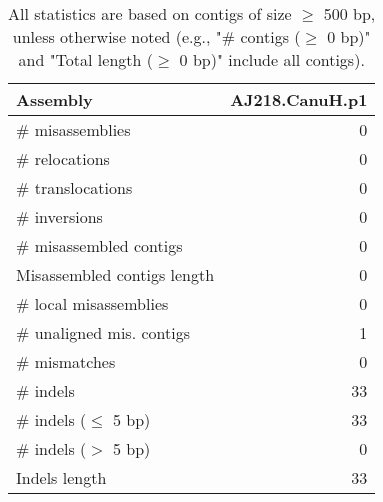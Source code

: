 \documentclass[12pt,a4paper]{article}
\begin{document}
\begin{table}[ht]
\begin{center}
\caption{All statistics are based on contigs of size $\geq$ 500 bp, unless otherwise noted (e.g., "\# contigs ($\geq$ 0 bp)" and "Total length ($\geq$ 0 bp)" include all contigs).}
\begin{tabular}{|l*{1}{|r}|}
\hline
Assembly & AJ218.CanuH.p1 \\ \hline
\# misassemblies & 0 \\ \hline
\hspace{5mm}\# relocations & 0 \\ \hline
\hspace{5mm}\# translocations & 0 \\ \hline
\hspace{5mm}\# inversions & 0 \\ \hline
\# misassembled contigs & 0 \\ \hline
Misassembled contigs length & 0 \\ \hline
\# local misassemblies & 0 \\ \hline
\# unaligned mis. contigs & 1 \\ \hline
\# mismatches & 0 \\ \hline
\# indels & 33 \\ \hline
\hspace{5mm}\# indels ($\leq$ 5 bp) & 33 \\ \hline
\hspace{5mm}\# indels ($>$ 5 bp) & 0 \\ \hline
Indels length & 33 \\ \hline
\end{tabular}
\end{center}
\end{table}
\end{document}
